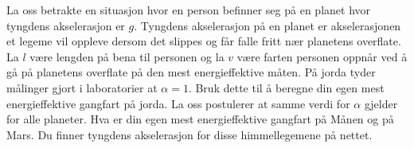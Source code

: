 \documentclass[a4paper,11pt]{article}
\begin{document}
    \iftoggle{isLF}{%
        La oss først regne ut måltallet til $\alpha$
        \begin{equation*}
            \brak{a} 
            = \brak{v} \brak{l}^{-\frac{1}{2}} \brak{g}^{-\frac{1}{2}}
            = \num{3.4} (\num{1.2})^{-\frac{1}{2}} (\num{4.5})^{-\frac{1}{2}}
            \approx \num{1.46313}.
        \end{equation*}%
        Ved å endre enheter får vi derimot
        \begin{align*}
            v &= \SI{3.4}{\m\per\s}
               = \num{3.4}\cdot
                 \SI{3.281}{\ft}
                 \biggr(\SI[quotient-mode=fraction]{1/3600}{\hour}\biggl)^{-1}\\
              &\approx \SI{4.015944e4}{\ft\per\hour}, \\
            l &= \SI{1.2}{\m} = \num{1.2}\cdot \SI{3.281}{\ft}  \\
              &= \SI{3.9372}{\ft},\\
            g &= \SI{4.5}{\m\per\s\squared}
               = \num{4.5}\cdot
                 \SI{3.281}{\ft}
                 \biggr(\SI[quotient-mode=fraction]{1/3600}{\hour}\biggl)^{-2}\\
              &= \SI{1.91347920e8}{\ft\per\hour\squared}.
        \end{align*}
        Dermed får vi at måltallet til $\alpha$ med nye enheter kan skrives
        \begin{align*}
               \brak{a} 
            &= \brak{v} \brak{l}^{-\frac{1}{2}} \brak{g}^{-\frac{1}{2}} \\
            &= (\num{40159.44}) 
               (\num{3.9372})^{-\frac{1}{2}} 
               (\num{1.91347920e8})^{-\frac{1}{2}}
            \approx \num{1.46313},
        \end{align*}%
        som var det samme resultatet som tidligere.
    }{}
    \begin{subproblem}
      La oss betrakte en situasjon hvor en person befinner seg på en
        planet hvor tyngdens akselerasjon er $g$. Tyngdens akselerasjon på en
        planet er akselerasjonen et legeme vil oppleve dersom det slippes og får
        falle fritt nær planetens overflate. La $l$ være lengden på bena til
        personen og la $v$ være farten personen oppnår ved å gå på planetens
        overflate på den mest energieffektive måten. På jorda tyder målinger
        gjort i laboratorier at $\alpha=1$. Bruk dette til å beregne din egen
        mest energieffektive gangfart på jorda. La oss postulerer at samme verdi
        for $\alpha$ gjelder for alle planeter. Hva er din egen mest
        energieffektive gangfart på Månen og på Mars. Du finner tyngdens
        akselerasjon for disse himmellegemene på nettet.
    \end{subproblem}
\end{document}
